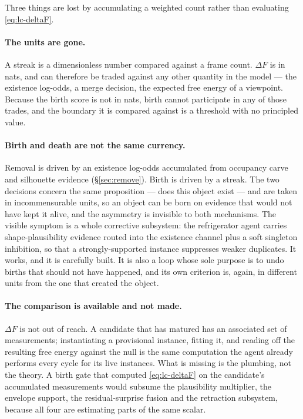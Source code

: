 \documentclass[11pt,a4paper]{report}
\begin{document}
Three things are lost by accumulating a weighted count rather than evaluating
\eqref{eq:lc-deltaF}.

\paragraph{The units are gone.} A streak is a dimensionless number compared against a frame count.
$\Delta F$ is in nats, and can therefore be traded against any other quantity in the model --- the
existence log-odds, a merge decision, the expected free energy of a viewpoint. Because the birth
score is not in nats, birth cannot participate in any of those trades, and the boundary it is
compared against is a threshold with no principled value.

\paragraph{Birth and death are not the same currency.} Removal is driven by an existence log-odds
accumulated from occupancy carve and silhouette evidence (\S\ref{sec:remove}). Birth is driven by a
streak. The two decisions concern the same proposition --- does this object exist --- and are taken
in incommensurable units, so an object can be born on evidence that would not have kept it alive,
and the asymmetry is invisible to both mechanisms. The visible symptom is a whole corrective
subsystem: the refrigerator agent carries shape-plausibility evidence routed into the existence
channel plus a soft singleton inhibition, so that a strongly-supported instance suppresses weaker
duplicates. It works, and it is carefully built. It is also a loop whose sole purpose is to undo
births that should not have happened, and its own criterion is, again, in different units from the
one that created the object.

\paragraph{The comparison is available and not made.} $\Delta F$ is not out of reach. A candidate
that has matured has an associated set of measurements; instantiating a provisional instance, fitting
it, and reading off the resulting free energy against the null is the same computation the agent
already performs every cycle for its live instances. What is missing is the plumbing, not the theory.
A birth gate that computed \eqref{eq:lc-deltaF} on the candidate's accumulated measurements would
subsume the plausibility multiplier, the envelope support, the residual-surprise fusion and the
retraction subsystem, because all four are estimating parts of the same scalar.
\end{document}
